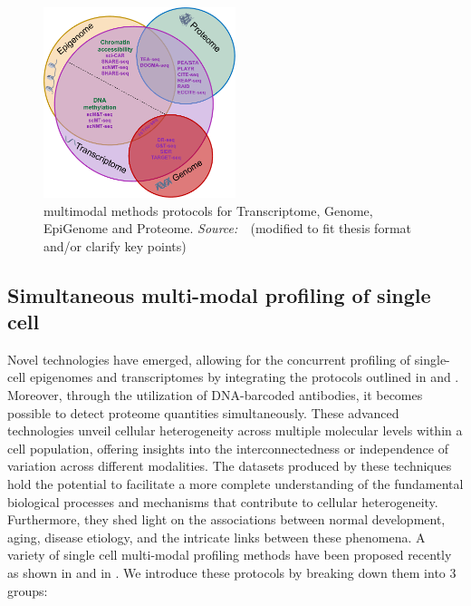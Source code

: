 \begin{figure}[!ht]
	\centering
	\includegraphics[width=0.50\textwidth]{multi-model-methods/fig}
	\vspace{0.1cm}
	\caption[multimodal methods protocols for Transcriptome, Genome, EpiGenome and Proteome]{multimodal methods protocols for Transcriptome, Genome, EpiGenome and Proteome. \emph{Source:~\cite{lee2020single}}~(modified to fit thesis format and/or clarify key points)}
	\label{fig:piechart-mulitmodal-methods}
\end{figure}



\subsection{Simultaneous multi-modal profiling of single cell}
\label{background:sec1:mulitmodal}
Novel technologies have emerged, allowing for the concurrent profiling of single-cell epigenomes and transcriptomes by integrating the protocols outlined in  and . Moreover, through the utilization of DNA-barcoded antibodies, it becomes possible to detect proteome quantities simultaneously. These advanced technologies unveil cellular heterogeneity across multiple molecular levels within a cell population, offering insights into the interconnectedness or independence of variation across different modalities. The datasets produced by these techniques hold the potential to facilitate a more complete understanding of the fundamental biological processes and mechanisms that contribute to cellular heterogeneity. Furthermore, they shed light on the associations between normal development, aging, disease etiology, and the intricate links between these phenomena. A variety of single cell multi-modal profiling methods have been proposed recently as shown in  and in . We introduce these protocols by breaking down them into 3 groups:

